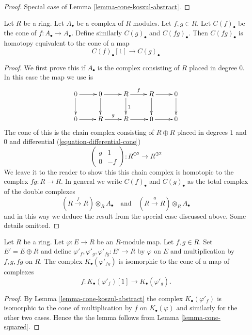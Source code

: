 \begin{proof}
Special case of
Lemma \ref{lemma-cone-koszul-abstract}.
\end{proof}

\begin{lemma}
\label{lemma-cone-squared}
Let $R$ be a ring. Let $A_\bullet$ be a complex of $R$-modules.
Let $f, g \in R$. Let $C(f)_\bullet$ be the cone of
$f : A_\bullet \to A_\bullet$. Define similarly $C(g)_\bullet$ and
$C(fg)_\bullet$. Then $C(fg)_\bullet$ is homotopy equivalent to the
cone of a map
$$
C(f)_\bullet[1] \longrightarrow C(g)_\bullet
$$
\end{lemma}

\begin{proof}
We first prove this if $A_\bullet$ is the complex consisting of $R$ placed
in degree $0$. In this case the map we use is
$$
\xymatrix{
0 \ar[r] \ar[d] &
0 \ar[r] \ar[d] &
R \ar[r]^f \ar[d]^1 &
R \ar[r] \ar[d] & 0 \ar[d] \\
0 \ar[r] & R \ar[r]^g & R \ar[r] & 0 \ar[r] & 0
}
$$
The cone of this is the chain complex consisting of $R \oplus R$ placed in
degrees $1$ and $0$ and differential (\ref{equation-differential-cone})
$$
\left(
\begin{matrix}
g & 1 \\
0 & -f
\end{matrix}
\right) :
R^{\oplus 2} \longrightarrow R^{\oplus 2}
$$
We leave it to the reader to show this this chain complex is
homotopic to the complex $fg : R \to R$. In general we
write $C(f)_\bullet$ and $C(g)_\bullet$
as the total complex of the double complexes
$$
(R \xrightarrow{f} R) \otimes_R A_\bullet
\quad\text{and}\quad
(R \xrightarrow{g} R) \otimes_R A_\bullet
$$
and in this way we deduce the result from the special case discussed above.
Some details omitted.
\end{proof}

\begin{lemma}
\label{lemma-koszul-mult-abstract}
Let $R$ be a ring. Let $\varphi : E \to R$ be an $R$-module map.
Let $f, g \in R$. Set $E' = E \oplus R$ and define
$\varphi'_f, \varphi'_g, \varphi'_{fg} : E' \to R$
by $\varphi$ on $E$ and multiplication by $f, g, fg$ on $R$.
The complex $K_\bullet(\varphi'_{fg})$ is isomorphic to the
cone of a map of complexes
$$
f :
K_\bullet(\varphi'_f)[1]
\longrightarrow
K_\bullet(\varphi'_g).
$$
\end{lemma}

\begin{proof}
By
Lemma \ref{lemma-cone-koszul-abstract}
the complex $K_\bullet(\varphi'_f)$ is isomorphic to the cone of
multiplication by $f$ on $K_\bullet(\varphi)$ and similarly
for the other two cases. Hence the the lemma follows from
Lemma \ref{lemma-cone-squared}.
\end{proof}

